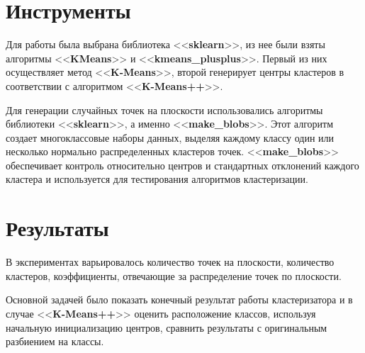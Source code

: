 \documentclass[12pt, a4paper]{article}
\begin{document}
    \section{Инструменты}
    
    Для работы была выбрана библиотека <<\textbf{sklearn}>>, из нее были взяты 
    алгоритмы <<\textbf{KMeans}>> и <<\textbf{kmeans\_plusplus}>>. Первый из них 
    осуществляет метод <<\textbf{K-Means}>>, второй генерирует центры кластеров в 
    соответствии с алгоритмом <<\textbf{K-Means++}>>.
    
    Для генерации случайных точек на плоскости использовались алгоритмы 
    библиотеки <<\textbf{sklearn}>>, а именно <<\textbf{make\_blobs}>>. Этот 
    алгоритм создает многоклассовые наборы данных, выделяя каждому классу один 
    или несколько нормально распределенных кластеров точек. 
    <<\textbf{make\_blobs}>> обеспечивает контроль относительно центров и 
    стандартных отклонений каждого кластера и используется для тестирования алгоритмов кластеризации.
    
    \section{Результаты}
    
    В экспериментах варьировалось количество точек на плоскости, количество кластеров, коэффициенты, отвечающие за распределение точек по плоскости. 
    
    Основной задачей было показать конечный результат работы кластеризатора и в случае <<\textbf{K-Means++}>> оценить расположение классов, используя начальную инициализацию центров, сравнить результаты с оригинальным разбиением на классы.
    
\end{document}
